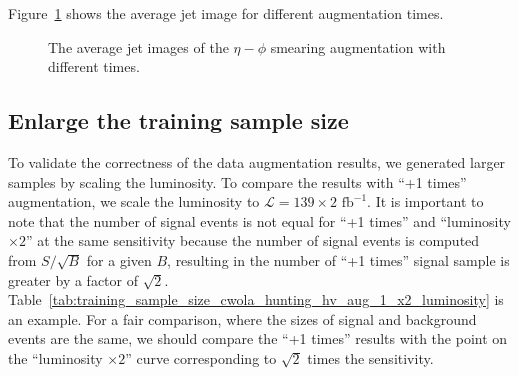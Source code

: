 \documentclass[12pt]{article}
\begin{document}
		 Figure~\ref{fig:eta_phi_smearing_phi_jet_constituent_average_jet_image_aug_1_3} shows the average jet image for different augmentation times.
		 \begin{figure}[htpb]
			\centering
			\caption{The average jet images of the $\eta-\phi$ smearing augmentation with different times.}
			\label{fig:eta_phi_smearing_phi_jet_constituent_average_jet_image_aug_1_3}
		\end{figure}
	\subsection{Enlarge the training sample size}%
	\label{sub:enlarge_the_training_sample_size}
		To validate the correctness of the data augmentation results, we generated larger samples by scaling the luminosity. To compare the results with ``+1 times'' augmentation, we scale the luminosity to $\mathcal{L} = 139 \times 2 \text{ fb}^{-1}$. It is important to note that the number of signal events is not equal for ``+1 times'' and ``luminosity $\times 2$'' at the same sensitivity because the number of signal events is computed from $S / \sqrt{B}$ for a given $B$, resulting in the number of ``+1 times'' signal sample is greater by a factor of $\sqrt{2}$. Table~\ref{tab:training_sample_size_cwola_hunting_hv_aug_1_x2_luminosity} is an example. For a fair comparison, where the sizes of signal and background events are the same, we should compare the ``+1 times'' results with the point on the ``luminosity $\times 2$'' curve corresponding to $\sqrt{2}$ times the sensitivity.
\end{document}
